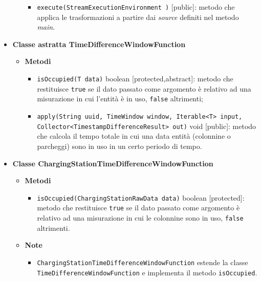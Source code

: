\begin{itemize}
\begin{itemize}
\begin{itemize}
			            \item \texttt{execute(StreamExecutionEnvironment )} [public]: metodo che applica le trasformazioni a partire dai \textit{source} definiti nel metodo \textit{main}.
		            \end{itemize}
	      \end{itemize}
	\item \textbf{Classe astratta TimeDifferenceWindowFunction}
	      \begin{itemize}
		      \item \textbf{Metodi}
		            \begin{itemize}
			            \item \texttt{isOccupied(T data)} boolean [protected,abstract]: metodo che restituisce \texttt{true} se il dato passato come argomento è relativo ad una misurazione in cui l'entità è in uso, \texttt{false} altrimenti;
			            \item \texttt{apply(String uuid, TimeWindow window, Iterable<T> input,} \\\texttt{Collector<TimestampDifferenceResult> out)} void [public]: metodo
			                  che calcola il tempo totale in cui una data entità (colonnine o parcheggi) sono in uso in un certo periodo di tempo.
		            \end{itemize}
	      \end{itemize}
	\item \textbf{Classe ChargingStationTimeDifferenceWindowFunction}
	      \begin{itemize}
		      \item \textbf{Metodi}
		            \begin{itemize}
			            \item \texttt{isOccupied(ChargingStationRawData data)} boolean [protected]: metodo che restituisce \texttt{true} se il dato passato come argomento è relativo ad una misurazione in cui le colonnine sono in uso, \texttt{false} altrimenti.
		            \end{itemize}
		      \item \textbf{Note}
		            \begin{itemize}
			            \item \texttt{ChargingStationTimeDifferenceWindowFunction} estende la classe \\\texttt{TimeDifferenceWindowFunction} e implementa il metodo \texttt{isOccupied}.
		            \end{itemize}
	      \end{itemize}

\end{itemize}
